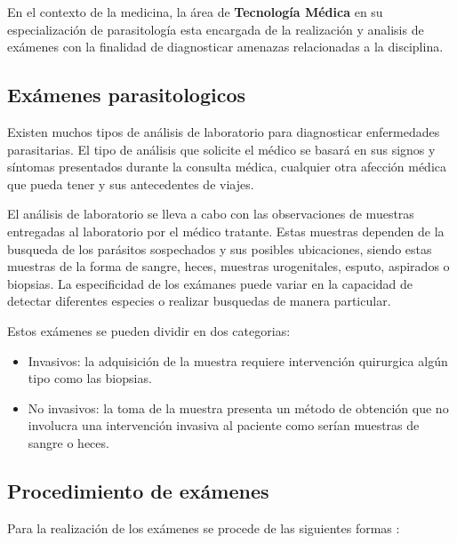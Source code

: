 \documentclass[letter,12pt]{report}
\begin{document}
En el contexto de la medicina, la área de \textbf{Tecnología Médica} en su
especialización de parasitología esta encargada de la realización y analisis de
exámenes con la finalidad de diagnosticar amenazas relacionadas a la disciplina.

\subsection{Exámenes parasitologicos}

Existen muchos tipos de análisis de laboratorio para diagnosticar enfermedades parasitarias.
El tipo de análisis que solicite el médico se basará en sus signos y síntomas presentados
durante la consulta médica, cualquier otra afección médica que pueda tener y sus
antecedentes de viajes.

El análisis de laboratorio se lleva a cabo con las observaciones de muestras entregadas
al laboratorio por el médico tratante. Estas muestras dependen de la busqueda de los
parásitos sospechados y sus posibles ubicaciones, siendo estas muestras de la forma de
sangre, heces, muestras urogenitales, esputo, aspirados o biopsias. La especificidad de
los exámanes puede variar en la capacidad de detectar diferentes especies o realizar
busquedas de manera particular.

Estos exámenes se pueden dividir en dos categorias:

\begin{itemize}
    \item Invasivos: la adquisición de la muestra requiere intervención
        quirurgica algún tipo como las biopsias.
    \item No invasivos: la toma de la muestra presenta un método de obtención que no
        involucra una intervención invasiva al paciente como serían muestras de sangre o
        heces.
\end{itemize}

\subsection{Procedimiento de exámenes}

Para la realización de los exámenes se procede de las siguientes formas \cite{c01}:
\end{document}
